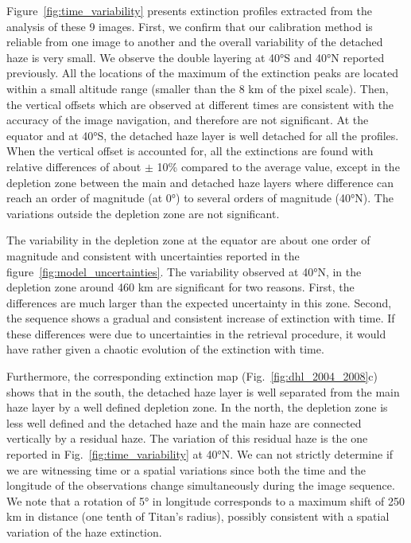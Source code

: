 \begin{figure*}[!ht]
\caption{Extinction profiles for the series
of 9 images taken 80 minutes apart in June 2005 (cf. Table \ref{tab:time_variability}).
The global latitudinal map is shown in figure~\ref{fig:dhl_2004_2008}c.}
\label{fig:time_variability}
\end{figure*}

Figure~\ref{fig:time_variability} presents extinction profiles extracted from the analysis of these 9 images.
First, we confirm that our calibration method is reliable from one image to another and the overall
variability of the detached haze is very small. We observe the double layering at \ang{40}S and \ang{40}N reported
previously. All the locations of the maximum of the extinction peaks are located within a small altitude range (smaller
than the 8 km of the pixel scale). Then, the vertical offsets which are observed at different times are consistent
with  the accuracy of the image navigation, and therefore are not significant. At the equator and at \ang{40}S, the detached
haze layer is well detached for all the profiles. When the vertical offset is accounted for, all the extinctions are found
with relative differences of about $\pm$ 10\% compared to the average value, except in the depletion zone between
the main and detached haze layers where difference can reach an order of magnitude (at \ang{0}) to several orders of magnitude
(\ang{40}N). The variations outside the depletion zone are not significant.

The variability in the depletion zone at the equator are about one order of magnitude and
consistent with uncertainties reported in the figure~\ref{fig:model_uncertainties}.
The variability observed at \ang{40}N, in the depletion zone around 460 km are significant for two reasons.
First, the differences are much larger than the expected uncertainty in this zone. Second, the sequence shows
a gradual and consistent increase of extinction with time. If these differences were due to uncertainties in
the retrieval procedure, it would have rather given a chaotic evolution of the extinction with time.

Furthermore, the corresponding extinction map (Fig.~\ref{fig:dhl_2004_2008}c) shows that in the south,
the detached haze layer is well separated from the main haze layer by a well defined depletion zone. In the north, the depletion
zone is less well defined and the detached haze and the main haze are connected vertically by a residual haze.
The variation of this residual haze is the one reported in Fig.~\ref{fig:time_variability} at \ang{40}N.
We can not strictly determine if we are witnessing time or a spatial variations since both the time and the longitude
of the observations change simultaneously during the image sequence. We note that a rotation of \ang{5} in longitude
corresponds to a maximum shift of 250 km in distance (one tenth of Titan's radius), possibly consistent with a spatial
variation of the haze extinction.
